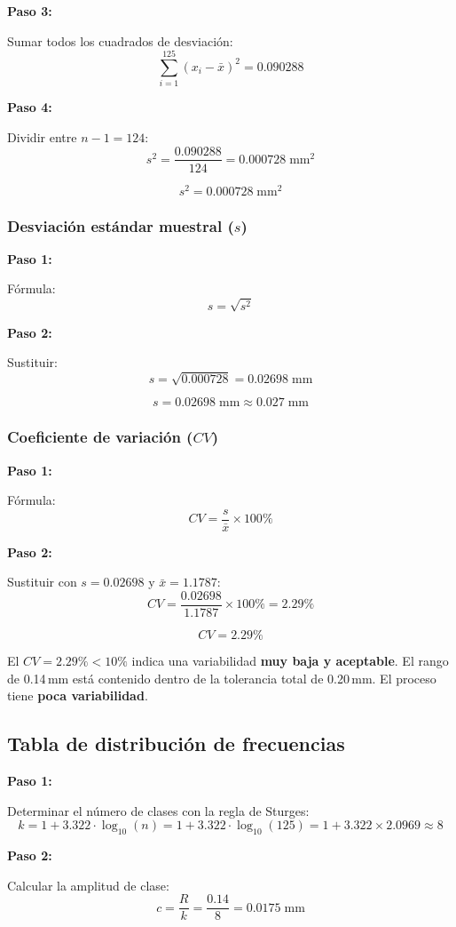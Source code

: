 \documentclass[12pt,letterpaper]{article}
\newcommand{\resultado}[2][Resultado]{%
  \begin{tcolorbox}[resultadoStyle, title={#1}]#2\end{tcolorbox}}
\newcommand{\interpretacion}[2][Interpretaci\'on]{%
  \begin{tcolorbox}[interpretacionStyle, title={#1}]#2\end{tcolorbox}}
\newcommand{\paso}[1]{%
  \vspace{4pt}%
  \begin{tcolorbox}[pasoStyle]%
    \textbf{\color{azulprin}Paso #1:}%
  \end{tcolorbox}%
  \vspace{2pt}}
\newcommand{\formula}[1]{\vspace{2pt}\[ #1 \]\vspace{-4pt}}
\begin{document}
\paso{3} Sumar todos los cuadrados de desviaci\'on:
\formula{\sum_{i=1}^{125}(x_i - \bar{x})^2 = 0.090288}

\paso{4} Dividir entre $n - 1 = 124$:
\formula{s^2 = \frac{0.090288}{124} = 0.000728\;\text{mm}^2}

\resultado[$s^2$ -- Varianza]{\[ s^2 = 0.000728\;\text{mm}^2 \]}

\subsubsection*{Desviaci\'on est\'andar muestral ($s$)}

\paso{1} F\'ormula:
\formula{s = \sqrt{s^2}}

\paso{2} Sustituir:
\formula{s = \sqrt{0.000728} = 0.02698\;\text{mm}}

\resultado[$s$ -- Desviaci\'on est\'andar]{\[ s = 0.02698\;\text{mm} \approx 0.027\;\text{mm} \]}

\subsubsection*{Coeficiente de variaci\'on ($CV$)}

\paso{1} F\'ormula:
\formula{CV = \frac{s}{\bar{x}} \times 100\%}

\paso{2} Sustituir con $s = 0.02698$ y $\bar{x} = 1.1787$:
\formula{CV = \frac{0.02698}{1.1787} \times 100\% = 2.29\%}

\resultado[$CV$ -- Coeficiente de variaci\'on]{\[ CV = 2.29\% \]}

\interpretacion[Dispersi\'on --- Problema 1]{
El $CV = 2.29\% < 10\%$ indica una variabilidad \textbf{muy baja y aceptable}.
El rango de 0.14\,mm est\'a contenido dentro de la tolerancia total de 0.20\,mm.
El proceso tiene \textbf{poca variabilidad}.}

\subsection{Tabla de distribuci\'on de frecuencias}

\paso{1} Determinar el n\'umero de clases con la regla de Sturges:
\formula{k = 1 + 3.322 \cdot \log_{10}(n) = 1 + 3.322 \cdot \log_{10}(125)
  = 1 + 3.322 \times 2.0969 \approx 8}

\paso{2} Calcular la amplitud de clase:
\formula{c = \frac{R}{k} = \frac{0.14}{8} = 0.0175\;\text{mm}}
\end{document}
